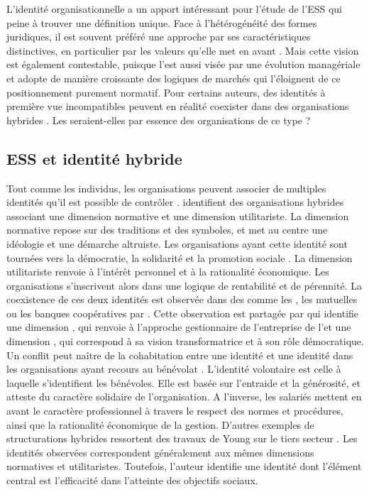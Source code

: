        L'identité organisationnelle a un apport intéressant pour l'étude de l'ESS qui peine à trouver une définition unique. Face à l'hétérogénéité des formes juridiques, il est souvent préféré une approche par ses caractéristiques distinctives, en particulier par les valeurs qu'elle met en avant \parencite{chedotel2004ambivalence}. Mais cette vision est également contestable, puisque l'\ess est aussi visée par une évolution managériale et adopte de manière croissante des logiques de marchés qui l'éloignent de ce positionnement purement normatif. Pour certains auteurs, des identités à première vue incompatibles peuvent en réalité coexister dans des organisations hybrides \parencite{chedotel2012linfluence, mariaux2018leconomie, foreman2002members}. Les \eess seraient-elles par essence des organisations de ce type ?


    \subsection{ESS et identité hybride}

        Tout comme les individus, les organisations peuvent associer de multiples identités qu'il est possible de contrôler \parencite{pratt2000classifying}. \textcite{foreman2002members} identifient des organisations hybrides associant une dimension normative et une dimension utilitariste. La dimension normative repose sur des traditions et des symboles, et met au centre une idéologie et une démarche altruiste. Les organisations ayant cette identité sont tournées vers la démocratie, la solidarité et la promotion sociale \parencite[][p.8]{chedotel2012linfluence}. La dimension utilitariste renvoie à l'intérêt personnel et à la rationalité économique. Les organisations s'inscrivent alors dans une logique de rentabilité et de pérennité. La coexistence de ces deux identités est observée dans des \oess comme les \scop, les mutuelles ou les banques coopératives par \textcite{chedotel2012linfluence}. Cette observation est partagée par \textcite{laville2016economie} qui identifie une dimension , qui renvoie à l'approche gestionnaire de l'entreprise de l'\ess et une dimension , qui correspond à sa vision transformatrice et à son rôle démocratique. Un conflit peut naître de la cohabitation entre une identité  et une identité  dans les organisations ayant recours au bénévolat \parencite{kreutzer2011volunteering}. L'identité volontaire est celle à laquelle s'identifient les bénévoles. Elle est basée sur l'entraide et la générosité, et atteste du caractère solidaire de l'organisation. A l'inverse, les salariés mettent en avant le caractère professionnel à travers le respect des normes et procédures, ainsi que la rationalité économique de la gestion. D'autres exemples de structurations hybrides ressortent des travaux de Young sur le tiers secteur \parencite{young2001organizational, young2000alternative}. Les identités observées correspondent généralement aux mêmes dimensions normatives et utilitaristes. Toutefois, l'auteur identifie une identité dont l'élément central est l'efficacité dans l'atteinte des objectifs sociaux. \\

